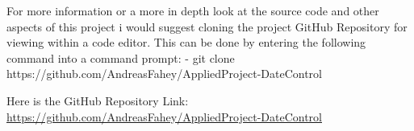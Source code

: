For more information or a more in depth look at the source code and other aspects of this project i would suggest cloning the project GitHub Repository for viewing within a code editor. This can be done by entering the following command into a command prompt:
\newline
- git clone https://github.com/AndreasFahey/AppliedProject-DateControl
\newline

Here is the GitHub Repository Link:
\newline
\url{https://github.com/AndreasFahey/AppliedProject-DateControl}



